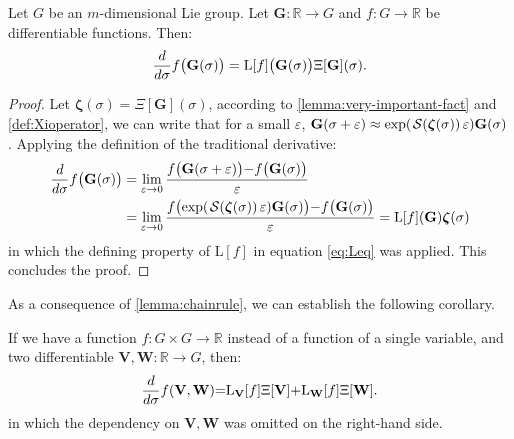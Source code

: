 \begin{lemma}\label{lemma:chainrule}
    Let $G$ be an $m$-dimensional Lie group. Let $\mathbf{G} : \mathbb{R} \to G$ and $f: G \to \mathbb{R}$ be differentiable functions. Then:
    \begin{align}
       \frac{d}{d\sigma} f\bigl(\mathbf{G}(\sigma)\bigr) = \textnormal{L}[f]\bigl(\mathbf{G}(\sigma)\bigr)\Xi[\mathbf{G}](\sigma).
    \end{align}
\end{lemma}
\begin{proof}
    Let $\boldsymbol{\zeta}(\sigma) = \Xi[\mathbf{G}](\sigma)$, according to \cref{lemma:very-important-fact} and \cref{def:Xioperator}, we can write that for a small $\varepsilon$, $\mathbf{G}(\sigma+\varepsilon) \approx \exp(\SL[\boldsymbol{\zeta}(\sigma)]\varepsilon)\mathbf{G}(\sigma)$. 
    Applying the definition of the traditional derivative:
    \begin{align}
        \begin{split}
            \frac{d}{d\sigma} f\bigl(\mathbf{G}(\sigma)\bigr) &= \lim_{\varepsilon \rightarrow 0} \frac{f\bigl(\mathbf{G}(\sigma+\varepsilon)\bigr){-}f\bigl(\mathbf{G}(\sigma)\bigr)}{\varepsilon}\\
            &  =
            \lim_{\varepsilon \rightarrow 0} \frac{f\bigl(\exp(\SL[\boldsymbol{\zeta}(\sigma)]\varepsilon)\mathbf{G}(\sigma)\bigr){-}f\bigl(\mathbf{G}(\sigma)\bigr)}{\varepsilon} = \text{L}[f](\mathbf{G}) \boldsymbol{\zeta}(\sigma)      
        \end{split}
    \end{align}
    in which the defining property of $\text{L}[f]$ in equation \eqref{eq:Leq} was applied. This concludes the proof.
\end{proof}

As a consequence of \cref{lemma:chainrule}, we can establish the following corollary.

\begin{corollary} \label{corol:corol1} If we have a function $f: G \times G \to \mathbb{R}$ instead of a function of a single variable, and two differentiable $\mathbf{V}, \mathbf{W} : \mathbb{R} \to G$, then:
\begin{equation}
   \frac{d}{d \sigma} f(\mathbf{V},\mathbf{W}) {=} \textnormal{L}_{\mathbf{V}}[f] \Xi[\mathbf{V}] {+} \textnormal{L}_{\mathbf{W}}[f] \Xi[\mathbf{W}].
\end{equation}
in which the dependency on $\mathbf{V}, \mathbf{W}$ was omitted on the right-hand side. 
\end{corollary}

